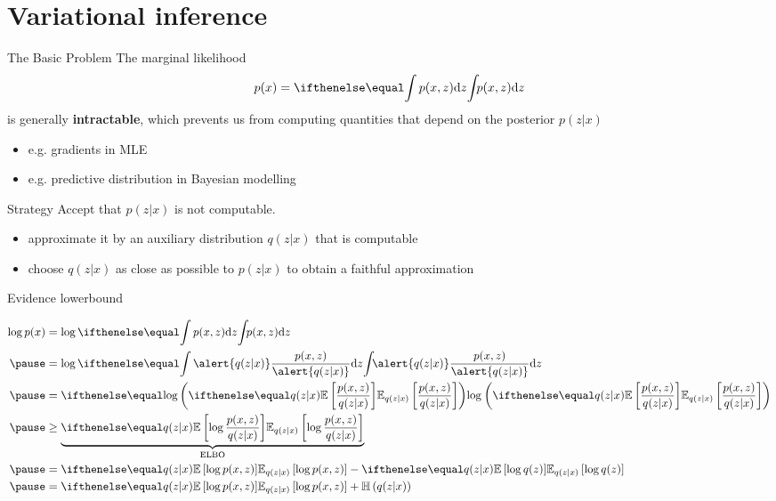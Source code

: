 \section{Variational inference}

\begin{frame}{The Basic Problem}
The marginal likelihood
$$ p(x) = \intl{ p(x,z) }{z} $$
is generally \textbf{intractable},  which prevents us from computing quantities that depend on the posterior $p(z|x)$

\begin{itemize}
	\item e.g. gradients in MLE
	\item e.g. predictive distribution in Bayesian modelling
\end{itemize}

\end{frame}


\begin{frame}{Strategy}
Accept that $ p(z|x) $ is not computable.
\pause
\begin{itemize}
	\item approximate it by an auxiliary distribution $ q(z|x) $ that is computable
	\item choose $ q(z|x) $ as close as possible to $ p(z|x) $ to obtain a faithful approximation
\end{itemize}

\end{frame}



\begin{frame}{Evidence lowerbound}

\begin{small}
\begin{equation*}
\begin{aligned}
\log p(x) &= \log \intl{p(x,z)}{z} \\
\pause
&= \log \intl{\alert{q(z|x)}\frac{p(x,z)}{\alert{q(z|x)}}}{z} \\
\pause
&= \loga{\E[q(z|x)]{\frac{p(x,z)}{{q(z|x)}}}} \\ \pause
&\geq \underbrace{\E[q(z|x)]{  \log{\frac{p(x,z)}{{q(z|x)}}}}}_{\text{ELBO}} \\
\pause
&= \E[q(z|x)]{ \log p(x, z)} - \E[q(z|x)]{\log q(z)}\\
\pause
& = \E[q(z|x)] {\log p(x, z)} + \Ent{q(z|x)}
\end{aligned}
\end{equation*}
\end{small}
\end{frame}

